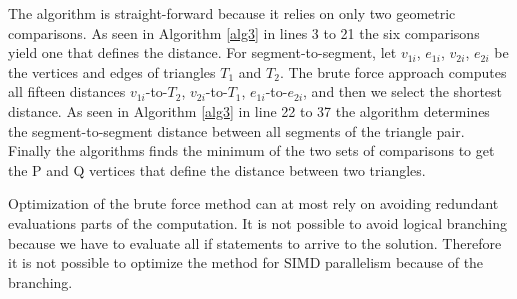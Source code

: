 \documentclass[times,12pt]{article}
\begin{document}
The algorithm is straight-forward because it relies on only two geometric comparisons. As seen in Algorithm \ref{alg3} in lines 3 to 21 the six comparisons yield one that defines the distance. For segment-to-segment, let $v_{1i}$, $e_{1i}$, $v_{2i}$, $e_{2i}$ be the vertices and edges of triangles $T_1$ and $T_2$. The brute force approach computes all fifteen distances $v_{1i}$-to-$T_2$, $v_{2i}$-to-$T_1$, $e_{1i}$-to-$e_{2i}$, and then we select the shortest distance. As seen in Algorithm \ref{alg3} in line 22 to 37 the algorithm determines the segment-to-segment distance between all segments of the triangle pair. Finally the algorithms finds the minimum of the two sets of comparisons to get the P and Q vertices that define the distance between two triangles. 

Optimization of the brute force method can at most rely on avoiding redundant evaluations parts of the computation. It is not possible to avoid logical branching because we have to evaluate all if statements to arrive to the solution. Therefore it is not possible to optimize the method for SIMD parallelism because of the branching. 
\end{document}
